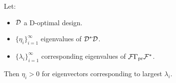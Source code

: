 \documentclass{beamer}
\begin{document}


\begin{frame}
  \begin{theorem}[D.]
    Let:
    \begin{itemize}
      \item \(\mathcal{D}\) a D-optimal design.
      \item \(\{\eta_i\}_{i=1}^{\infty}\) eigenvalues of \(\mathcal{D}^*\mathcal{D}\).
      \item \(\{\lambda_i\}_{i=1}^{\infty}\) corresponding eigenvalues of \(\mathcal{F} \Gamma_{\textup{pr}} \mathcal{F}^*\).
    \end{itemize}
    Then \(\eta_i > 0\) for eigenvectors corresponding to largest \(\lambda_i\).
  \end{theorem}
  
  

\end{frame}


\optimalvsnot
\end{document}
